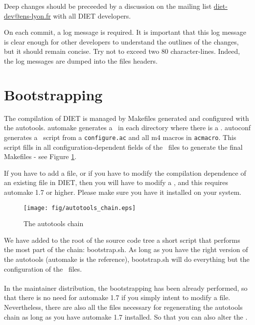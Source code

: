 Deep changes should be preceeded by a discussion on the mailing list
\url{diet-dev@ens-lyon.fr} with all DIET developers.

On each commit, a log message is required. It is important that this log message
is clear enough for other developers to understand the outlines of the changes,
but it should remain concise. Try not to exceed two 80 character-lines.  Indeed,
the log messages are dumped into the files headers.


\section{Bootstrapping}

The compilation of DIET is managed by Makefiles generated and configured with
the autotools. \textsf{automake} generates a \makein\ in each
directory where there is a \makeam. \textsf{autoconf} generates a
\configure\ script from a \texttt{configure.ac} and all m4 macros in
\texttt{acmacro}. This script fills in all configuration-dependent fields of the
\makein\ files to generate the final Makefiles - see Figure
\ref{fig:autochain}.

If you have to add a file, or if you have to modify the
compilation dependence of an existing file in DIET, then you will have to modify
a \makeam, and this requires \textsf{automake 1.7} or
higher. Please make sure you have it installed on your system.


\begin{figure}[hbt]
\begin{center}
\texttt{[image: fig/autotools\_chain.eps]}
\end{center}
\label{fig:autochain}
\caption{The autotools chain}
\end{figure}

We have added to the root of the source code tree a short script that performs
the most part of the chain: \textsf{bootstrap.sh}. As long as you have the right
version of the autotools (\textsf{automake} is the reference),
\textsf{bootstrap.sh} will do everything but the configuration of the
\makein\ files.\\

\\

\noindent
{} In the maintainer distribution, the bootstrapping has been already
performed, so that there is no need for \textsf{automake 1.7} if you simply
intent to modify a file. Nevertheless, there are also all the files necessary
for regenerating the autotools chain as long as you have \textsf{automake 1.7}
installed. So that you can also alter the \makeam.




